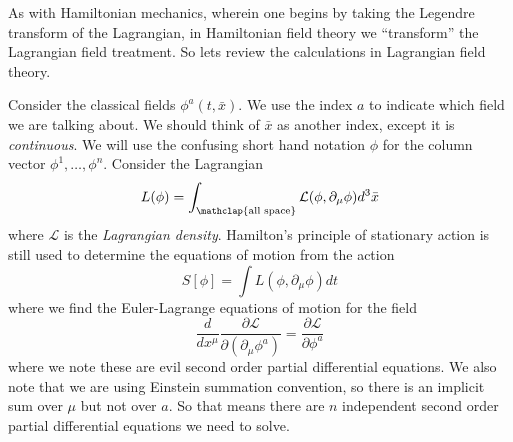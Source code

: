 
As with Hamiltonian mechanics, wherein one begins by taking the
Legendre transform of the Lagrangian, in Hamiltonian field theory
we ``transform'' the Lagrangian field treatment. So lets review
the calculations in Lagrangian field theory.

Consider the classical fields $\phi^{a}(t,\bar{x})$. We use the
index $a$ to indicate which field we are talking about. We should
think of $\bar{x}$ as another index, except it is \emph{continuous}.
We will use the confusing short hand notation $\phi$ for the
column vector $\phi^{1},\ldots,\phi^{n}$. Consider the Lagrangian
\begin{equation}%
L(\phi) = \int_{\mathclap{\text{all space}}}\mathcal{L}(\phi,\partial_{\mu}\phi)d^{3}\bar{x}
\end{equation}
where $\mathcal{L}$ is the \emph{Lagrangian density}. Hamilton's
principle of stationary action is still used to determine the
equations of motion from the action
\begin{equation}%
S[\phi] = \int L(\phi,\partial_{\mu}\phi)dt
\end{equation}
where we find the Euler-Lagrange equations of motion for the field
\begin{equation}%
\frac{d}{dx^{\mu}}\frac{\partial\mathcal{L}}{\partial (\partial_{\mu}\phi^{a})}=\frac{\partial\mathcal{L}}{\partial\phi^{a}}
\end{equation}
where we note these are evil second order partial differential
equations. We also note that we are using Einstein summation
convention, so there is an implicit sum over $\mu$ but not over
$a$. So that means there are $n$ independent second order
partial differential equations we need to solve.

